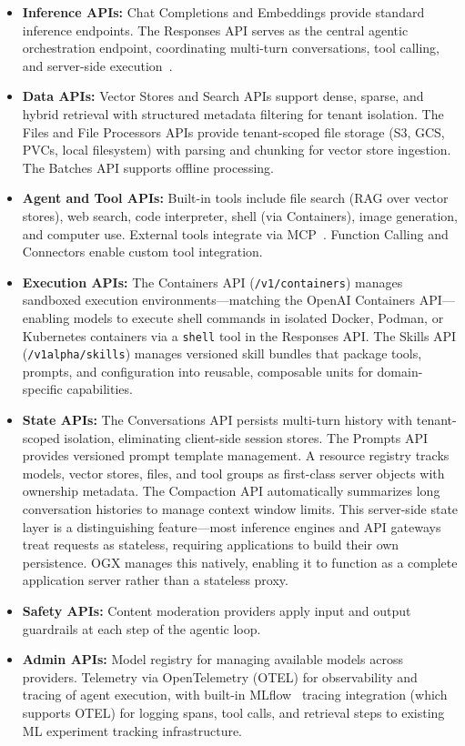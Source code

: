 \documentclass[11pt]{article}
\begin{document}
\begin{itemize}[nosep]
  \item \textbf{Inference APIs:} Chat Completions and Embeddings provide standard inference endpoints. The Responses API serves as the central agentic orchestration endpoint, coordinating multi-turn conversations, tool calling, and server-side execution~\cite{openaiResponsesAPI}.
  \item \textbf{Data APIs:} Vector Stores and Search APIs support dense, sparse, and hybrid retrieval with structured metadata filtering for tenant isolation. The Files and File Processors APIs provide tenant-scoped file storage (S3, GCS, PVCs, local filesystem) with parsing and chunking for vector store ingestion. The Batches API supports offline processing.
  \item \textbf{Agent and Tool APIs:} Built-in tools include file search (RAG over vector stores), web search, code interpreter, shell (via Containers), image generation, and computer use. External tools integrate via MCP~\cite{mcp}. Function Calling and Connectors enable custom tool integration.
  \item \textbf{Execution APIs:} The Containers API (\texttt{/v1/containers}) manages sandboxed execution environments---matching the OpenAI Containers API---enabling models to execute shell commands in isolated Docker, Podman, or Kubernetes containers via a \texttt{shell} tool in the Responses API. The Skills API (\texttt{/v1alpha/skills}) manages versioned skill bundles that package tools, prompts, and configuration into reusable, composable units for domain-specific capabilities.
  \item \textbf{State APIs:} The Conversations API persists multi-turn history with tenant-scoped isolation, eliminating client-side session stores. The Prompts API provides versioned prompt template management. A resource registry tracks models, vector stores, files, and tool groups as first-class server objects with ownership metadata. The Compaction API automatically summarizes long conversation histories to manage context window limits. This server-side state layer is a distinguishing feature---most inference engines and API gateways treat requests as stateless, requiring applications to build their own persistence. OGX manages this natively, enabling it to function as a complete application server rather than a stateless proxy.
  \item \textbf{Safety APIs:} Content moderation providers apply input and output guardrails at each step of the agentic loop.
  \item \textbf{Admin APIs:} Model registry for managing available models across providers. Telemetry via OpenTelemetry (OTEL) for observability and tracing of agent execution, with built-in MLflow~\cite{mlflow} tracing integration (which supports OTEL) for logging spans, tool calls, and retrieval steps to existing ML experiment tracking infrastructure.
\end{itemize}
\end{document}
